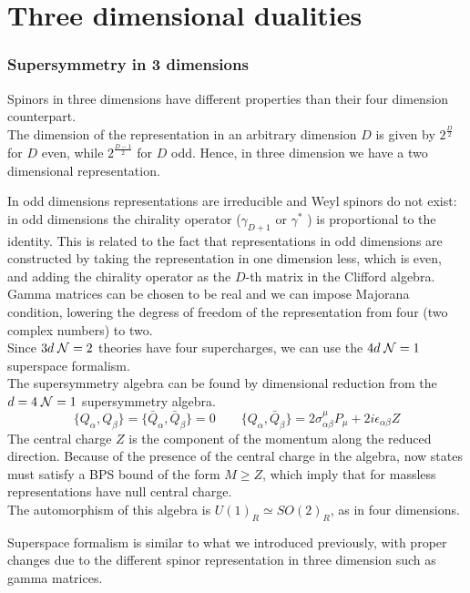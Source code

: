 

\chapter{Three dimensional dualities}
\subsection{Supersymmetry in 3 dimensions}
Spinors in three dimensions have different properties than their four dimension counterpart.\\
The dimension of the representation in an arbitrary dimension $D$  is given by $2^{\frac{D}{2}} $
for $D$ even, while $2^{\frac{D-1}{2}} $ for $D$ odd.
Hence, in three dimension we have a two dimensional representation.

In odd dimensions representations are irreducible and Weyl spinors do not exist: in odd dimensions the chirality operator ($\gamma_{D+1}$ or $\gamma^*$ ) is proportional to the identity.
This is related to the fact that representations in odd dimensions are constructed by taking the representation in one dimension less, which is even, and adding the chirality operator as the $D$-th matrix in the Clifford algebra.\\
Gamma matrices can be chosen to be real and we can impose Majorana condition, lowering the degress of freedom of the representation from four (two complex numbers) to two.\\
Since $3d \; \mathcal{N}=2$ theories have four supercharges, we can use the $4d \; \mathcal{N}=1$ superspace formalism. 
\\
The supersymmetry algebra can be found by dimensional reduction from  the $d=4 \; \mathcal{N}=1$ supersymmetry algebra. 
\begin{equation}
 \{ Q_{\alpha},Q_{\beta} \} =  \{ \bar{Q}_{\alpha},\bar{Q}_{\beta} \}= 0 \qquad \{ Q_{\alpha} , \bar{Q}_{\beta}   \} = 2 \sigma^{\mu}_{\alpha \beta} P_{\mu} + 2 i \epsilon_{\alpha \beta} Z
 \end{equation} 
The central charge $Z$ is the component of the momentum  along the reduced direction.
Because of the presence of the central charge in the algebra, now states must satisfy a BPS bound of the form $M \geq Z $, which imply that for massless representations have null central charge.
\\
The automorphism of this algebra is $U(1)_R \simeq SO(2)_R$, as in four dimensions.

Superspace formalism is similar to what we introduced previously, with proper changes due to the different spinor representation in three dimension such as gamma matrices.

